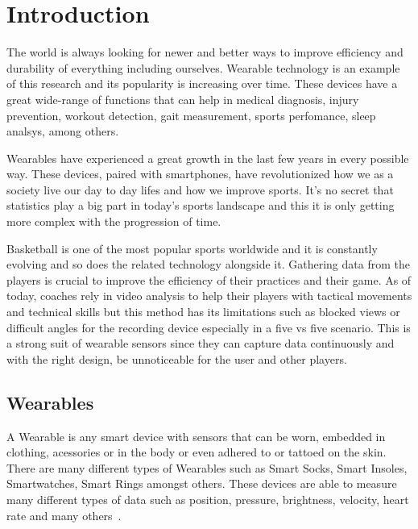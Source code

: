 

%

\chapter{Introduction}
\label{cha:introduction}

The world is always looking for newer and better ways to improve efficiency and durability of everything including ourselves. Wearable technology is an example of this research and its popularity is increasing over time. 
These devices have a great wide-range of functions that can help in medical diagnosis, injury prevention, workout detection, gait measurement, sports perfomance, sleep analsys, among others.

Wearables have experienced a great growth in the last few years in every possible way. These devices, paired with smartphones, have revolutionized how we as a society live our day to day lifes and how 
we improve sports. It's no secret that statistics play a big part in today's sports landscape and this it is only getting more complex with the progression of time.

Basketball is one of the most popular sports worldwide and it is constantly evolving and so does the related technology alongside it. Gathering data from the players is crucial 
to improve the efficiency of their practices and their game. As of today, coaches rely in video analysis to help their players with tactical movements and technical skills but this method has its 
limitations such as blocked views or difficult angles for the recording device especially in a five vs five scenario. This is a strong suit of wearable sensors since they can capture data
continuously and with the right design, be unnoticeable for the user and other players.

\newpage

\section{Wearables}
\label{sec:wearables}
A Wearable is any smart device with sensors that can be worn, embedded in clothing, acessories or in the body or even adhered to or tattoed on the skin. There are many different 
types of Wearables such as Smart Socks, Smart Insoles, Smartwatches, Smart Rings amongst others. These devices are able to measure many different types of data such as position, pressure, 
brightness, velocity, heart rate and many others~\cite{reviewWearableTech}.

